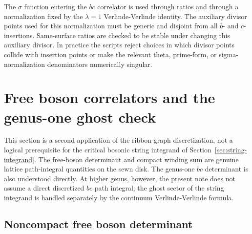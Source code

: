 \documentclass[11pt]{article}
\numberwithin{equation}{section}
\begin{document}
The \(\sigma\) function entering the \(bc\) correlator is used through ratios
and through a normalization fixed by the \(\lambda=1\) Verlinde-Verlinde
identity.  The auxiliary divisor points used for this normalization must be
generic and disjoint from all \(b\)- and \(c\)-insertions.  Same-surface ratios
are checked to be stable under changing this auxiliary divisor.  In practice
the scripts reject choices in which divisor points collide with insertion
points or make the relevant theta, prime-form, or sigma-normalization
denominators numerically singular.


\section{Free boson correlators and the genus-one ghost check}
\label{sec:free-boson}

This section is a second application of the ribbon-graph discretization, not a
logical prerequisite for the critical bosonic string integrand of
Section~\ref{sec:string-integrand}.  The free-boson determinant and compact
winding sum are genuine lattice path-integral quantities on the sewn disk.  The
genus-one \(bc\) determinant is also understood directly.  At higher genus,
however, the present note does not assume a direct discretized \(bc\) path
integral; the ghost sector of the string integrand is handled separately by the
continuum Verlinde-Verlinde formula.

\subsection{Noncompact free boson determinant}
\end{document}
